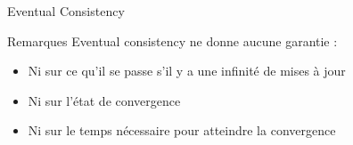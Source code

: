 \begin{frame}{Eventual Consistency}
  \vspace{-1mm}
  \begin{alertblock}{Remarques}
    \vspace{-1mm}
    Eventual consistency ne donne aucune garantie :
    \begin{itemize}
    \item Ni sur ce qu'il se passe s'il y a une infinité de mises à jour
    \item Ni sur l'état de convergence
    \item Ni sur le temps nécessaire pour atteindre la convergence
    \end{itemize}
  \end{alertblock}


\end{frame}

\endgroup
\endinput
